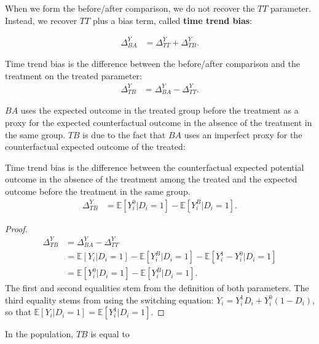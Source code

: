 \documentclass[]{book}
\newcommand{\esp}[1]{\mathbb{E}[ #1 ]}
\theoremstyle{definition}
\theoremstyle{definition}
\theoremstyle{definition}
\theoremstyle{remark}
\let\BeginKnitrBlock\begin \let\EndKnitrBlock\end
\begin{document}
When we form the before/after comparison, we do not recover the \(TT\) parameter.
Instead, we recover \(TT\) plus a bias term, called \textbf{time trend bias}:

\begin{align*}
\Delta^Y_{BA} & =\Delta^Y_{TT}+\Delta^Y_{TB}.
\end{align*}

\BeginKnitrBlock{definition}[Time trend bias]
\protect\hypertarget{def:unnamed-chunk-26}{}{\label{def:unnamed-chunk-26} \iffalse (Time trend bias) \fi{} }Time trend bias is the difference between the before/after comparison and the treatment on the treated parameter:
\begin{align*}
\Delta^Y_{TB} & = \Delta^Y_{BA}-\Delta^Y_{TT} .
\end{align*}
\EndKnitrBlock{definition}

\(BA\) uses the expected outcome in the treated group before the treatment as a proxy for the expected counterfactual outcome in the absence of the treatment in the same group.
\(TB\) is due to the fact that \(BA\) uses an imperfect proxy for the counterfactual expected outcome of the treated:

\BeginKnitrBlock{theorem}
\protect\hypertarget{thm:TB}{}{\label{thm:TB} }Time trend bias is the difference between the counterfactual expected potential outcome in the absence of the treatment among the treated and the expected outcome before the treatment in the same group.
\begin{align*}
\Delta^Y_{TB} & = \esp{Y_i^0|D_i=1}-\esp{Y_i^B|D_i=1}.
\end{align*}
\EndKnitrBlock{theorem}

\BeginKnitrBlock{proof}
\iffalse{} {Proof. } \fi{}\begin{align*}
\Delta^Y_{TB} & = \Delta^Y_{BA}-\Delta^Y_{TT} \\
              & = \esp{Y_i|D_i=1}-\esp{Y^B_i|D_i=1}-\esp{Y_i^1-Y_i^0|D_i=1}\\
              & = \esp{Y_i^0|D_i=1}-\esp{Y_i^B|D_i=1}.
\end{align*}
The first and second equalities stem from the definition of both parameters.
The third equality stems from using the switching equation: \(Y_i=Y_i^1D_i+Y_i^0(1-D_i)\), so that \(\esp{Y_i|D_i=1}=\esp{Y^1_i|D_i=1}\).
\EndKnitrBlock{proof}

\BeginKnitrBlock{example}
\protect\hypertarget{exm:unnamed-chunk-28}{}{\label{exm:unnamed-chunk-28} }In the population, \(TB\) is equal to
\EndKnitrBlock{example}
\end{document}
